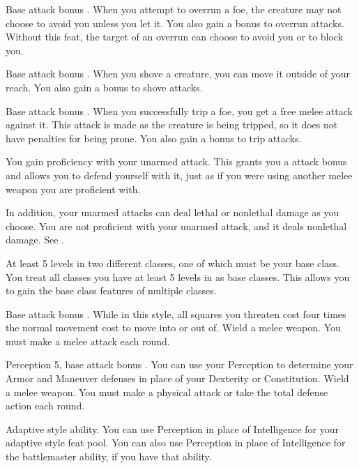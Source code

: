 \featpre Base attack bonus .
\featben When you attempt to overrun a foe, the creature may not choose to avoid you unless you let it.
You also gain a  bonus to overrun attacks.
Without this feat, the target of an overrun can choose to avoid you or to block you.

\featpre Base attack bonus .
\featben When you shove a creature, you can move it outside of your reach.
You also gain a  bonus to shove attacks.

\featpre Base attack bonus .
\featben When you successfully trip a foe, you get a free melee attack against it.
This attack is made as the creature is being tripped, so it does not have penalties for being prone.
You also gain a  bonus to trip attacks.

\featben You gain proficiency with your unarmed attack.
This grants you a  attack bonus and allows you to defend yourself with it, just as if you were using another melee weapon you are proficient with.

In addition, your unarmed attacks can deal lethal or nonlethal damage as you choose.
 You are not proficient with your unarmed attack, and it deals nonlethal damage. See .

\featpre At least 5 levels in two different classes, one of which must be your base class.
\featben You treat all classes you have at least 5 levels in as base classes.
This allows you to gain the base class features of multiple classes.

\featpre Base attack bonus .
\featben While in this style, all squares you threaten cost four times the normal movement cost to move into or out of.
\stylereq Wield a melee weapon.
You must make a melee attack each round.

\featpres Perception 5, base attack bonus .
\featben You can use your Perception to determine your Armor and Maneuver defenses in place of your Dexterity or Constitution.
\stylereq Wield a melee weapon.
You must make a physical attack or take the total defense action each round.

\featpre Adaptive style ability.
\featben You can use Perception in place of Intelligence for your adaptive style feat pool.
You can also use Perception in place of Intelligence for the battlemaster ability, if you have that ability.

